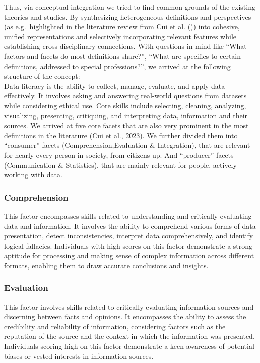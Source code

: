 \documentclass[
  12pt,
  a4paper,
  twoside]{article}
\begin{document}
Thus, via conceptual integration we tried to find common grounds of the
existing theories and studies. By synthesizing heterogeneous definitions
and perspectives (as e.g.~highlighted in the literature review from Cui
et al. ()) into cohesive, unified
representations and selectively incorporating relevant features while
establishing cross-disciplinary connections. With questions in mind like
``What factors and facets do most definitions share?'', ``What are
specifics to certain definitions, addressed to special professions?'',
we arrived at the following structure of the concept:\\
Data literacy is the ability to collect, manage, evaluate, and apply
data effectively. It involves asking and answering real-world questions
from datasets while considering ethical use. Core skills include
selecting, cleaning, analyzing, visualizing, presenting, critiquing, and
interpreting data, information and their sources. We arrived at five
core facets that are also very prominent in the most definitions in the
literature (Cui et al., 2023). We further divided them into ``consumer''
facets (Comprehension,Evaluation \& Integration), that are relevant for
nearly every person in society, from citizens up. And ``producer''
facets (Communication \& Statistics), that are mainly relevant for
people, actively working with data.

\subsubsection{Comprehension}\label{comprehension}

This factor encompasses skills related to understanding and critically
evaluating data and information. It involves the ability to comprehend
various forms of data presentation, detect inconsistencies, interpret
data comprehensively, and identify logical fallacies. Individuals with
high scores on this factor demonstrate a strong aptitude for processing
and making sense of complex information across different formats,
enabling them to draw accurate conclusions and insights.

\subsubsection{Evaluation}\label{evaluation}

This factor involves skills related to critically evaluating information
sources and discerning between facts and opinions. It encompasses the
ability to assess the credibility and reliability of information,
considering factors such as the reputation of the source and the context
in which the information was presented. Individuals scoring high on this
factor demonstrate a keen awareness of potential biases or vested
interests in information sources.
\end{document}
